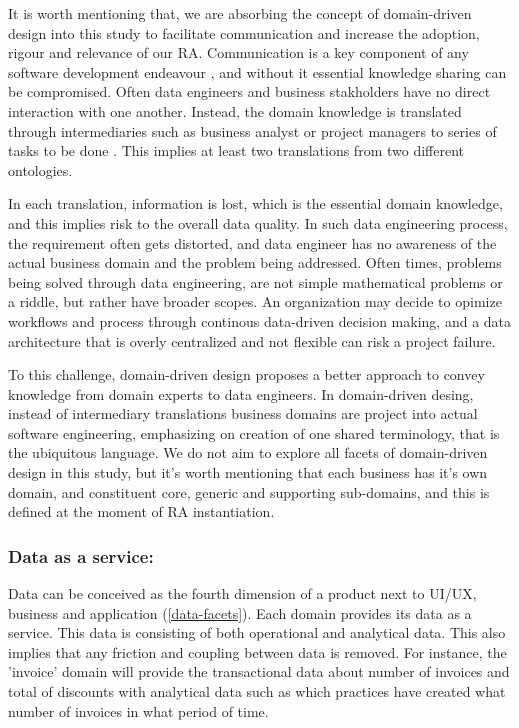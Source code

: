 \documentclass[review]{elsarticle}
\begin{document}
It is worth mentioning that, we are absorbing the concept of domain-driven design into this study to facilitate communication and increase the adoption, rigour and relevance of our RA. Communication is a key component of any software development endeavour \cite{sudhakar2012model}, and without it essential knowledge sharing can be compromised. Often data engineers and business stakholders have no direct interaction with one another. Instead, the domain knowledge is translated through intermediaries such as business analyst or project managers to series of tasks to be done \cite{khononov2021learning}. This implies at least two translations from two different ontologies. 

In each translation, information is lost, which is the essential domain knowledge, and this implies risk to the overall data quality. In such data engineering process, the requirement often gets distorted, and data engineer has no awareness of the actual business domain and the problem being addressed. Often times, problems being solved through data engineering, are not simple mathematical problems or a riddle, but rather have broader scopes. An organization may decide to opimize workflows and process through continous data-driven decision making, and a data architecture that is overly centralized and not flexible can risk a project failure. 

To this challenge, domain-driven design proposes a better approach to convey knowledge from domain experts to data engineers. In domain-driven desing, instead of intermediary translations business domains are project into actual software engineering, emphasizing on creation of one shared terminology, that is the ubiquitous language. We do not aim to explore all facets of domain-driven design in this study, but it's worth mentioning that each business has it's own domain, and constituent core, generic and supporting sub-domains, and this is defined at the moment of RA instantiation. 

\subsubsection{Data as a service:}

Data can be conceived as the fourth dimension of a product next to UI/UX, business and application (\ref{data-facets}). Each domain provides its data as a service. This data is consisting of both operational and analytical data. This also implies that any friction and coupling between data is removed. For instance, the 'invoice' domain will provide the transactional data about number of invoices and total of discounts with analytical data such as which practices have created what number of invoices in what period of time.
\end{document}
